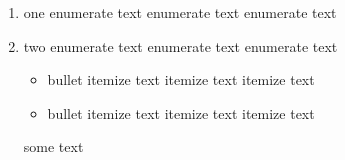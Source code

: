 \begin{enumerate}\item

	      one
	      enumerate text
	      enumerate text
	      enumerate text\item

	      two
	      enumerate text
	      enumerate text
	      enumerate text
	      \begin{itemize}\item

		            bullet
		            itemize text
		            itemize text
		            itemize text\item

		            bullet
		            itemize text
		            itemize text
		            itemize text
	      \end{itemize}
	      some text
\end{enumerate}
